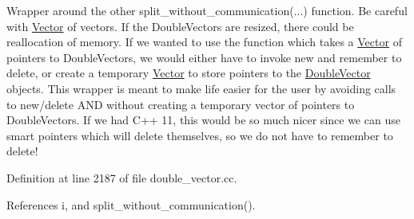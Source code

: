 Wrapper around the other split\+\_\+without\+\_\+communication(...) function. Be careful with \hyperlink{classoomph_1_1Vector}{Vector} of vectors. If the Double\+Vectors are resized, there could be reallocation of memory. If we wanted to use the function which takes a \hyperlink{classoomph_1_1Vector}{Vector} of pointers to Double\+Vectors, we would either have to invoke new and remember to delete, or create a temporary \hyperlink{classoomph_1_1Vector}{Vector} to store pointers to the \hyperlink{classoomph_1_1DoubleVector}{Double\+Vector} objects. This wrapper is meant to make life easier for the user by avoiding calls to new/delete A\+ND without creating a temporary vector of pointers to Double\+Vectors. If we had C++ 11, this would be so much nicer since we can use smart pointers which will delete themselves, so we do not have to remember to delete! 



Definition at line 2187 of file double\+\_\+vector.\+cc.



References i, and split\+\_\+without\+\_\+communication().


